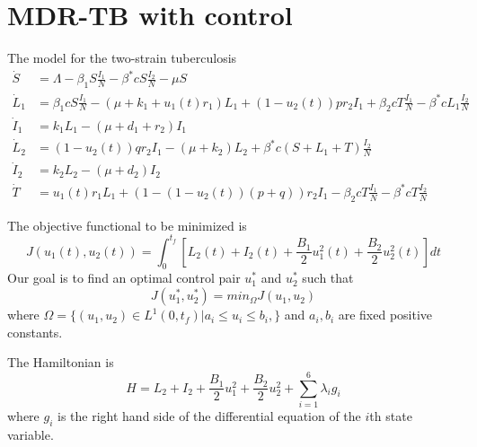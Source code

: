 \section{MDR-TB with control}  \label{Chap4-Sect2} 

The model for the two-strain tuberculosis 
\begin{align*}
	\dot{S}	&= 
    	\Lambda -\beta_{1} S \frac{I_1}{N} - \beta^{*}cS\frac{I_2}{N} - 
        \mu S 
        \\
    \dot{L}_1 &= 
    	\beta_{1} cS \frac{I_1}{N} - (\mu + k_1 + u_1(t)r_1)L_{1} + 
        (1 - u_2(t))pr_2 I_1 + \beta_{2} cT \frac{I_1}{N} -
        \beta^{*}cL_{1}\frac{I_2}{N}  
        \\
    \dot{I}_1 &=  
    	k_1 L_{1} - (\mu + d_1 + r_2)I_1  
        \\
    \dot{L}_2 &=  
    	(1 - u_2(t))q r_2 I_1 - (\mu + k_2)L_2 + \beta^{*}c(S + L_1 + 
        T)\frac{I_2}{N}  
        \\
    \dot{I}_2 &=  
    	k_2 L_2 - (\mu + d_2)I_2  
        \\
    \dot{T} &=  
    	u_1(t)r_1 L_{1} + (1-(1-u_2(t))(p+q))r_2 I_1 - \beta_{2} cT \frac{I_1}{N} - 
        \beta^{*}cT\frac{I_2}{N}  
\end{align*}

The objective functional to be minimized is 
$$
    J(u_1(t),u_2(t)) = \int_{0}^{t_f} %
        \left[%
            L_2(t) + I_2(t) + \dfrac{B_1}{2} u_{1}^{2}(t) + \dfrac{B_2}{2} u_{2}^{2}(t)%
        \right] dt
$$
Our goal is to find an optimal control pair $u_{1}^{*}$ and $u_{2}^{*}$ such that
$$
    J(u_{1}^{*},u_{2}^{*}) = min_{\Omega}J(u_1,u_2)
$$
where $\Omega = \{(u_1,u_2) \in L^{1}(0, t_{f}) | a_i \leq u_i \leq b_i, \}$ and
$a_i , b_i$ are fixed positive constants. 

The Hamiltonian is
$$
    H = L_2 + I_2 + \dfrac{B_1}{2} u_{1}^{2} + \dfrac{B_2}{2} u_{2}^{2} +
        \sum_{i=1}^{6} \lambda_i g_i
$$
where $g_i$ is the right hand side of the differential equation of the $i$th
state variable.

